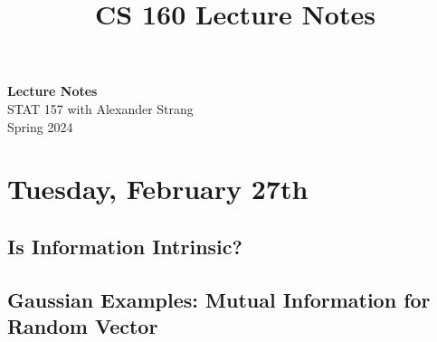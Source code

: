 \documentclass[11pt]{article}
\begin{document}
    \title{CS 160 Lecture Notes}
    
    \thispagestyle{empty}

    \begin{center}
    {\LARGE \bf Lecture Notes}\\
    {\large STAT 157 with Alexander Strang}\\
    Spring 2024
    \end{center}
    
    \tableofcontents

    
     
    
    
    
    
    
    
    
    
    
    
    
    
    \section{Tuesday, February 27th}
    \subsection{Is Information Intrinsic?}
    \begin{minipage}{\textwidth}
    
    \end{minipage}
    

\newpage
    \subsection{Gaussian Examples: Mutual Information for Random Vector}
    \begin{minipage}{\textwidth}
    
    \end{minipage}
    
\end{document}
